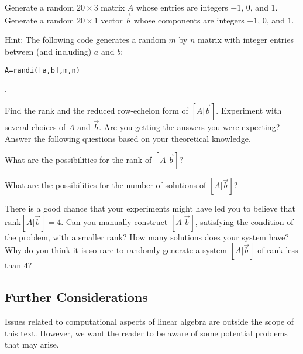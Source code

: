 \documentclass{ximera}
\begin{document}
\begin{problem}\label{prob_oct_sys_3}
    Generate a random $20\times 3$ matrix $A$ whose entries are integers $-1$, $0$, and $1$.  Generate a random $20\times 1$ vector $\vec{b}$ whose components are integers $-1$, $0$, and $1$.  
    
    Hint: The following code generates a random $m$ by $n$ matrix with integer entries between (and including) $a$ and $b$:  
    \begin{verbatim}A=randi([a,b],m,n)\end{verbatim}.

    Find the rank and the reduced row-echelon form of $[A | \vec{b}]$.  Experiment with several choices of $A$ and $\vec{b}$.  Are you getting the answers you were expecting?  Answer the following questions based on your theoretical knowledge.

    What are the possibilities for the rank of $[A | \vec{b}]$?  

    \begin{multipleChoice}
    \end{multipleChoice}

    What are the possibilities for the number of solutions of $[A | \vec{b}]$?

    \begin{multipleChoice}
    \end{multipleChoice}

    There is a good chance that your experiments might have led you to believe that $\text{rank}[A | \vec{b}]=4$.  Can you manually construct $[A | \vec{b}]$, satisfying the condition of the problem, with a smaller rank?  How many solutions does your system have?  Why do you think it is so rare to randomly generate a system $[A | \vec{b}]$ of rank less than $4$?
    
\end{problem}

\subsection*{Further Considerations}
Issues related to computational aspects of linear algebra are outside the scope of this text.  However, we want the reader to be aware of some potential problems that may arise.
\end{document}
